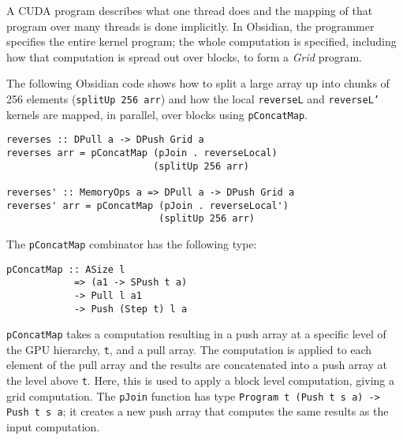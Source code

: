 

A CUDA program describes what one thread does and the mapping of that 
program over many threads is done implicitly.
In Obsidian, the programmer specifies the entire kernel
program;  the whole computation is specified, including how that computation 
is spread out over blocks, to form a {\em Grid} program. 

The following Obsidian code shows how to split a large array up into 
chunks of 256 elements ({\tt splitUp 256 arr}) and how the local {\tt reverseL} 
and {\tt reverseL'} kernels are  mapped, in parallel, over blocks using {\tt pConcatMap}. 

\begin{small} 
\begin{verbatim} 
reverses :: DPull a -> DPush Grid a
reverses arr = pConcatMap (pJoin . reverseLocal)
                          (splitUp 256 arr) 

reverses' :: MemoryOps a => DPull a -> DPush Grid a
reverses' arr = pConcatMap (pJoin . reverseLocal')
                           (splitUp 256 arr) 
\end{verbatim} 
\end{small} 

\noindent
The {\tt pConcatMap} combinator has the following type: 
\begin{small}
\begin{Verbatim}[samepage=true] 
pConcatMap :: ASize l 
            => (a1 -> SPush t a) 
            -> Pull l a1 
            -> Push (Step t) l a
\end{Verbatim}
\end{small}

{\tt pConcatMap} takes a computation resulting in a push array at a specific 
level of the GPU hierarchy, {\tt t}, and a pull array. The computation 
is applied to each element of the pull array and the results are concatenated 
into a push array at the level above {\tt t}. Here, this is used to apply a block 
level computation, giving a grid computation. The {\tt pJoin} function 
has type \verb!Program t (Push t s a) -> Push t s a!; it creates a new push array 
that computes the same results as the input computation.


